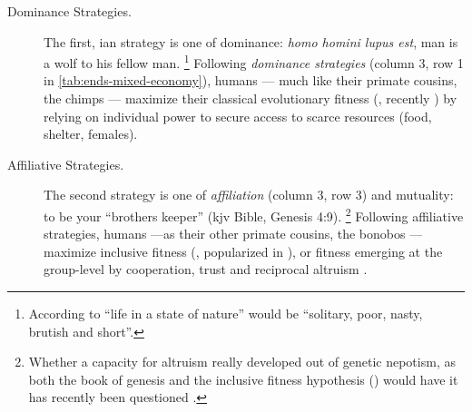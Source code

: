 \begin{description}
	\item[Dominance Strategies.]
	The first, \citeauthor{Hobbes-1651-aa}ian \citeyearpar{Hobbes-1651-aa}
	strategy is one of dominance:
	\emph{homo homini lupus est}, man is a wolf to his fellow man.
	\footnote{
		According to \cite{Hobbes-1651-aa} ``life in a state of nature'' would be ``solitary, poor, nasty, brutish and short''.
	}
	Following \emph{dominance strategies} (column 3, row 1 in \autoref{tab:ends-mixed-economy}), humans --- much like their primate cousins, the chimps --- maximize their classical evolutionary fitness (\citealt{Darwin1859}, recently \citealt{Dawkins1976}) by relying on individual power to secure access to scarce resources (food, shelter, females).

	\item[Affiliative Strategies.]
	The second strategy is one of \emph{affiliation} (column 3, row 3) and mutuality:
	to be your ``brothers keeper'' (\gls{kjv} Bible, Genesis 4:9).
	\footnote{
		Whether a capacity for altruism really developed out of genetic nepotism, as both the book of genesis and the inclusive fitness hypothesis (\citealt{Hamilton1964,Wilson1975}) would have it has recently been questioned \citep{Wilson2012}.
	}
	Following affiliative strategies, humans ---as their other primate cousins, the bonobos --- maximize inclusive fitness (\citealt{Hamilton1964}, popularized in \citealt{Wilson1975}), or fitness emerging at the group-level \citep{Wilson2012} by cooperation, trust and reciprocal altruism \citeyearpar[202ff]{Pickett-2009-kx}.
\end{description}



